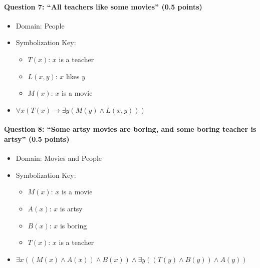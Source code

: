 \documentclass[letterpaper,11pt]{article}
\theoremstyle{mytheor}
\begin{document}
\paragraph{Question 7: ``All teachers like some movies'' (0.5 points)}
\phantom{a}
\begin{framed}
    \begin{itemize}
        \item Domain: People
        \item Symbolization Key:
        \begin{itemize}
            \item $T(x)$: $x$ is a teacher
            \item $L(x,y)$: $x$ likes $y$
            \item $M(x)$: $x$ is a movie
        \end{itemize}
        \item $\forall x \left(T(x) \rightarrow \exists y \left(M(y) \land L(x,y)\right)\right)$
    \end{itemize}
\end{framed}

\paragraph{Question 8: ``Some artsy movies are boring, and some boring teacher is artsy'' (0.5 points)}
\phantom{a}
\begin{framed}
    \begin{itemize}
        \item Domain: Movies and People
        \item Symbolization Key:
        \begin{itemize}
            \item $M(x)$: $x$ is a movie
            \item $A(x)$: $x$ is artsy
            \item $B(x)$: $x$ is boring
            \item $T(x)$: $x$ is a teacher
        \end{itemize}
        \item $\exists x \left(\left(M(x) \land A(x)\right) \land B(x)\right) \land \exists y \left( \left(T(y) \land B(y)\right) \land A(y)\right)$
    \end{itemize}
\end{framed}
\end{document}
